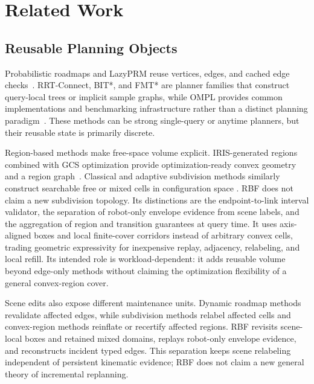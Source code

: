 \documentclass[journal]{IEEEtran}
\newcommand{\rbf}{RBF}
\begin{document}
\section{Related Work}\label{sec:related}

\subsection{Reusable Planning Objects}
Probabilistic roadmaps and LazyPRM reuse vertices, edges, and cached edge
checks~\cite{kavraki1996probabilistic,bohlin2000path,dellin2016unifying}.
RRT-Connect, BIT*, and FMT* are planner families that
construct query-local trees or implicit sample graphs, while OMPL provides
common implementations and benchmarking infrastructure rather than a distinct
planning paradigm~\cite{karaman2011sampling,kuffner2000rrt,gammell2015batch,
gammell2018informed,janson2015fmt,sucan2012ompl,moll2015benchmarking}. These
methods can be strong single-query or anytime planners, but their reusable state
is primarily discrete.

Region-based methods make free-space volume explicit. IRIS-generated regions
combined with GCS optimization provide optimization-ready convex geometry and a
region graph~\cite{deits2015computing,marcucci2023motion,
marcucci2024shortest,amice2022finding,petersen2023growing,
werner2024approximating}. Classical and adaptive subdivision methods similarly
construct searchable free or mixed cells in configuration space
\cite{lozanoperez1983spatial,brooks1985subdivision}. \rbf{} does not claim a
new subdivision topology. Its distinctions are the endpoint-to-link interval
validator, the separation of robot-only envelope evidence from scene labels,
and the aggregation of region and transition guarantees at query time. It uses
axis-aligned boxes and local finite-cover corridors instead of arbitrary convex
cells, trading geometric expressivity for inexpensive replay, adjacency,
relabeling, and local refill. Its intended role is workload-dependent: it adds
reusable volume beyond edge-only methods without claiming the optimization
flexibility of a general convex-region cover.

Scene edits also expose different maintenance units. Dynamic roadmap methods
revalidate affected edges, while subdivision methods relabel affected cells and
convex-region methods reinflate or recertify affected regions. \rbf{} revisits
scene-local boxes and retained mixed domains, replays robot-only envelope
evidence, and reconstructs incident typed edges. This separation keeps scene
relabeling independent of persistent kinematic evidence; \rbf{} does not claim
a new general theory of incremental replanning.
\end{document}
